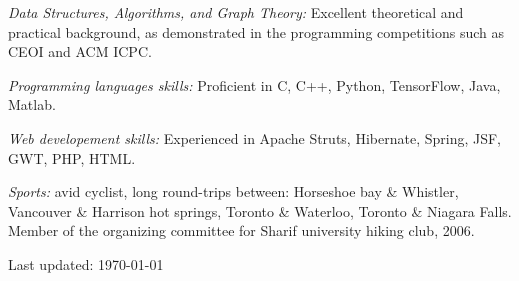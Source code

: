 \documentclass[10pt,letterpaper]{article}
\def\footerlink{}
\renewenvironment{itemize}{
  \begin{list}{}{
    \setlength{\leftmargin}{1.5em}
  }
}{
  \end{list}
}
\begin{document}
\begin{itemize}
\item \textit{Data Structures, Algorithms, and Graph Theory:}
  Excellent theoretical and practical background, as demonstrated in
  the programming competitions such as CEOI and ACM ICPC.
\item \textit{Programming languages skills:} Proficient in C, C++, Python,
  TensorFlow, Java, Matlab.
\item \textit{Web developement skills:} Experienced in Apache Struts,
  Hibernate, Spring, JSF, GWT, PHP, HTML.

\item \textit{Sports:} avid cyclist, long round-trips between:
  Horseshoe bay \& Whistler, Vancouver \& Harrison hot springs,
  Toronto \& Waterloo, Toronto \& Niagara Falls.\\ Member of the organizing committee for Sharif university hiking club, 2006.
\end{itemize}



\bigskip

\begin{center}
  \begin{footnotesize}
    Last updated: \today \\
    \href{\footerlink}{\texttt{\footerlink}}
  \end{footnotesize}
\end{center}
\end{document}
